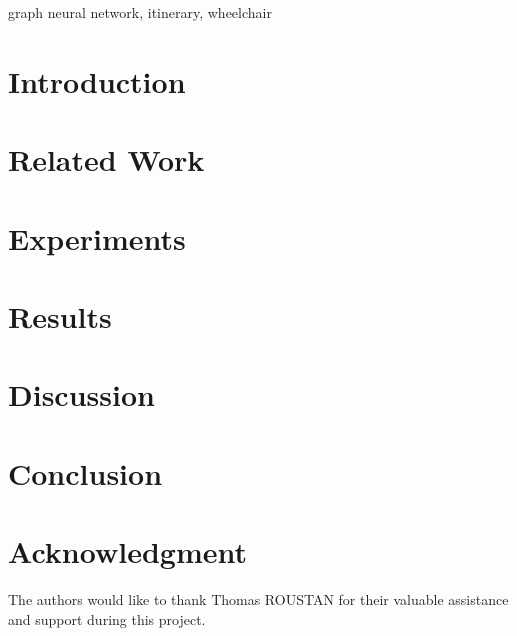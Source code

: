 \documentclass[conference]{IEEEtran}
\begin{document}
    \begin{IEEEkeywords}
        graph neural network, itinerary, wheelchair
    \end{IEEEkeywords}


    \section{Introduction}\label{sec:introduction}
    


    \section{Related Work}\label{sec:related-work}
    


    \section{Experiments}\label{sec:experiments}
    


    \section{Results}\label{sec:results}
    


    \section{Discussion}\label{sec:discussion}
    


    \section{Conclusion}\label{sec:conclusion}
    

    \section*{Acknowledgment}
    The authors would like to thank Thomas ROUSTAN for their valuable assistance and support during this project.

    
    
\end{document}
